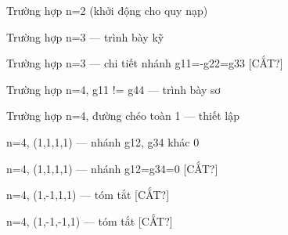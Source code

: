 \begin{frame}{Trường hợp n=2 (khởi động cho quy nạp)}
\note{
}
\end{frame}

\begin{frame}{Trường hợp n=3 — trình bày kỹ}
\note{
}
\end{frame}

\begin{frame}{Trường hợp n=3 — chi tiết nhánh g11=-g22=g33 [CẮT?]}
\note{
}
\end{frame}

\begin{frame}{Trường hợp n=4, g11 != g44 — trình bày sơ}
\note{
}
\end{frame}

\begin{frame}{Trường hợp n=4, đường chéo toàn 1 — thiết lập}
\note{
}
\end{frame}

\begin{frame}{n=4, (1,1,1,1) — nhánh g12, g34 khác 0}
\note{
}
\end{frame}

\begin{frame}{n=4, (1,1,1,1) — nhánh g12=g34=0 [CẮT?]}
\note{
}
\end{frame}

\begin{frame}{n=4, (1,-1,1,1) — tóm tắt [CẮT?]}
\note{
}
\end{frame}

\begin{frame}{n=4, (1,-1,-1,1) — tóm tắt [CẮT?]}
\note{
}
\end{frame}

